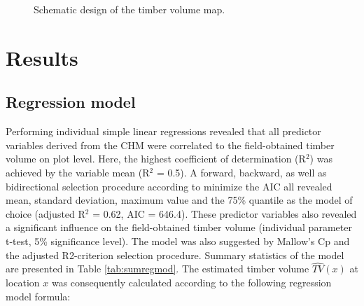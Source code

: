 \begin{figure}[H]
	\centering
	\caption{Schematic design of the timber volume map.}
	\label{fig:mapdesign}
\end{figure}



\section{Results}
\label{sec:Res}

\subsection{Regression model}
\label{sec:resmod}

Performing individual simple linear regressions revealed that all predictor variables derived from the CHM were correlated to the field-obtained timber volume on plot level. Here, the highest coefficient of determination (R$^2$) was achieved by the variable mean (R$^2$ = 0.5). A forward, backward, as well as bidirectional selection procedure according to minimize the AIC all revealed mean, standard deviation, maximum value and the 75\% quantile as the model of choice (adjusted R$^2$ = 0.62, AIC = 646.4). These predictor variables also revealed a significant influence on the field-obtained timber volume (individual parameter t-test, 5\% significance level). The model was also suggested by Mallow's Cp and the adjusted R2-criterion selection procedure. Summary statistics of the model are presented in Table \ref{tab:sumregmod}. The estimated timber volume $\hat{TV}(x)$ at location $x$ was consequently calculated according to the following regression model formula:

